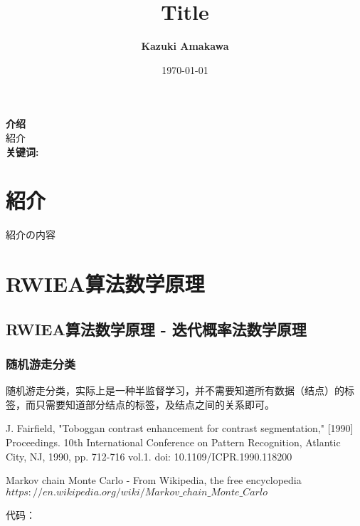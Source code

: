\documentclass[UTF8]{ctexart}
\title{Title}
\author{\textbf{Kazuki Amakawa}}
\date{\today}
\begin{document}
\maketitle
\noindent \textbf{介绍}\\
紹介\\

\noindent \textbf{关键词:} \\[20ex]
\thispagestyle{empty}
\newpage
\tableofcontents
\thispagestyle{empty}
\newpage
\setcounter{page}{1}
\newpage
\section{紹介}
紹介の内容

\newpage
\section{RWIEA算法数学原理}
\subsection{RWIEA算法数学原理 - 迭代概率法数学原理}
\subsubsection{随机游走分类}
随机游走分类，实际上是一种半监督学习，并不需要知道所有数据（结点）的标签，而只需要知道部分结点的标签，及结点之间的关系即可。\\

\newpage
\medskip
\begin{thebibliography}{9}
J. Fairfield, "Toboggan contrast enhancement for contrast segmentation," [1990] Proceedings. 10th International Conference on Pattern Recognition, Atlantic City, NJ, 1990, pp. 712-716 vol.1. doi: 10.1109/ICPR.1990.118200

Markov chain Monte Carlo - From Wikipedia, the free encyclopedia
\\\texttt{$https://en.wikipedia.org/wiki/Markov\_chain\_Monte\_Carlo$}


\end{thebibliography}

\noindent 代码：\texttt{$$}\\
\end{document}
